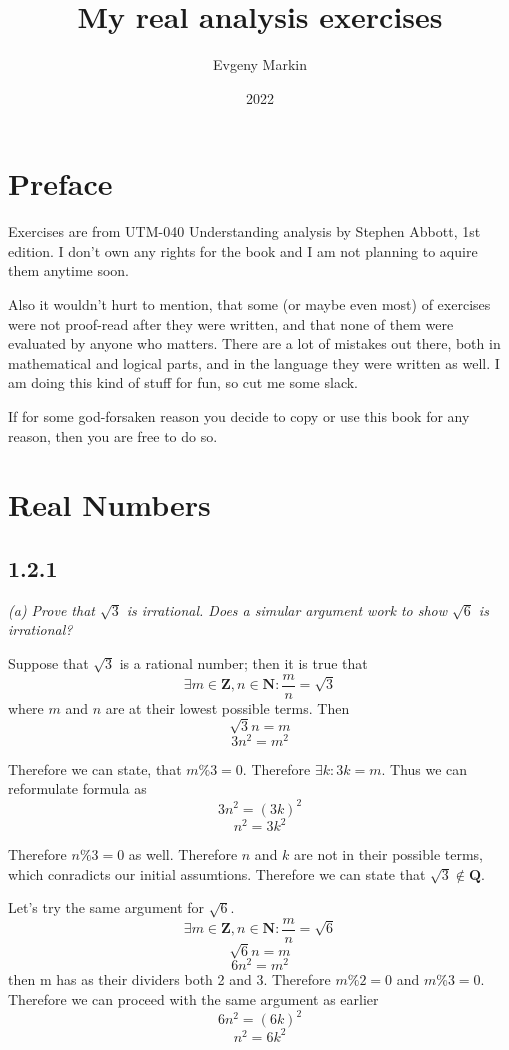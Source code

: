 \documentclass[11pt,oneside,titlepage]{book}
\title{My real analysis exercises}
\author{Evgeny Markin}
\date{2022}
\begin{document}
\maketitle
\tableofcontents

\chapter*{Preface}

Exercises are from UTM-040 Understanding analysis by Stephen Abbott, 1st
edition. I don't own any rights
for the book and I am not planning to aquire them anytime soon. 

Also it wouldn't hurt to mention, that some (or maybe even most) of exercises
were not proof-read after they were written,  and that none of them were
evaluated by anyone who matters. There are a lot of mistakes out  there, both
in mathematical and logical parts, and in the language they were written as
well. I am doing this kind of stuff for fun, so cut me some slack.

If for some god-forsaken reason you decide to copy or use this book for
any reason, then you are free to do so.

\chapter{Real Numbers}

\section*{1.2.1}
\textit{(a) Prove that $\sqrt{3}$ is irrational. Does a simular argument work
  to show $\sqrt{6}$ is irrational?}

Suppose that $\sqrt{3}$ is a rational number; then it is true that
$$\exists m \in \textbf{Z}, n \in \textbf{N}: \frac{m}{n} = \sqrt{3}$$
where $m$ and $n$ are at their lowest possible terms. Then
$$\sqrt{3}n = m$$
$$3n^2 = m^2$$

Therefore we can state, that $m \% 3 = 0$. Therefore $\exists k: 3k = m$.
Thus we can reformulate formula as
$$3n^2 = (3k)^2$$
$$n^2 = 3k^2$$

Therefore $n\%3 = 0$ as well. Therefore $n$ and $k$ are not in their possible
terms, which conradicts our initial assumtions. Therefore we can state that
$\sqrt{3} \notin \textbf{Q}$.

Let's try the same argument for $\sqrt{6}$.
$$\exists m \in \textbf{Z}, n \in \textbf{N}: \frac{m}{n} = \sqrt{6}$$
$$\sqrt{6}n = m$$
$$6n^2 = m^2$$
then m has as their dividers both 2 and 3. Therefore $m\%2 = 0$ and $m\%3 = 0$.
Therefore we can proceed with the same argument as earlier
$$6n^2 = (6k)^2$$
$$n^2 = 6k^2$$
\end{document}
